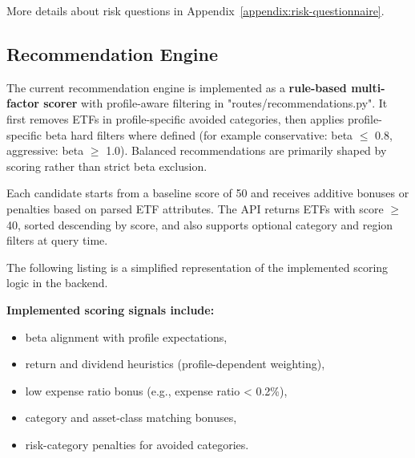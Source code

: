 More details about risk questions in Appendix~\ref{appendix:risk-questionnaire}.


\subsection{Recommendation Engine}

The current recommendation engine is implemented as a \textbf{rule-based multi-factor scorer} with profile-aware filtering in "routes/recommendations.py". It first removes ETFs in profile-specific avoided categories, then applies profile-specific beta hard filters where defined (for example conservative: beta \(\le\) 0.8, aggressive: beta \(\ge\) 1.0). Balanced recommendations are primarily shaped by scoring rather than strict beta exclusion.

Each candidate starts from a baseline score of 50 and receives additive bonuses or penalties based on parsed ETF attributes. The API returns ETFs with score \(\ge\) 40, sorted descending by score, and also supports optional category and region filters at query time.

The following listing is a simplified representation of the implemented scoring logic in the backend.

\textbf{Implemented scoring signals include:}
\begin{itemize}
    \item beta alignment with profile expectations,
    \item return and dividend heuristics (profile-dependent weighting),
    \item low expense ratio bonus (e.g., expense ratio < 0.2\%),
    \item category and asset-class matching bonuses,
    \item risk-category penalties for avoided categories.
\end{itemize}

